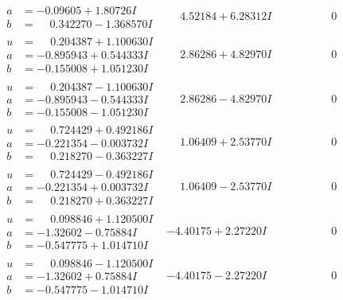 \documentclass[1p]{elsarticle_modified}
\theoremstyle{definition}
\begin{document}
$$\begin{array}{c|c|c}
\begin{aligned}
a &= -0.09605 + 1.80726 I \\
b &= \phantom{-}0.342270 - 1.368570 I\end{aligned}
 & \phantom{-}4.52184 + 6.28312 I & \phantom{-0.000000 } 0 \\ \hline\begin{aligned}
u &= \phantom{-}0.204387 + 1.100630 I \\
a &= -0.895943 + 0.544333 I \\
b &= -0.155008 + 1.051230 I\end{aligned}
 & \phantom{-}2.86286 + 4.82970 I & \phantom{-0.000000 } 0 \\ \hline\begin{aligned}
u &= \phantom{-}0.204387 - 1.100630 I \\
a &= -0.895943 - 0.544333 I \\
b &= -0.155008 - 1.051230 I\end{aligned}
 & \phantom{-}2.86286 - 4.82970 I & \phantom{-0.000000 } 0 \\ \hline\begin{aligned}
u &= \phantom{-}0.724429 + 0.492186 I \\
a &= -0.221354 - 0.003732 I \\
b &= \phantom{-}0.218270 - 0.363227 I\end{aligned}
 & \phantom{-}1.06409 + 2.53770 I & \phantom{-0.000000 } 0 \\ \hline\begin{aligned}
u &= \phantom{-}0.724429 - 0.492186 I \\
a &= -0.221354 + 0.003732 I \\
b &= \phantom{-}0.218270 + 0.363227 I\end{aligned}
 & \phantom{-}1.06409 - 2.53770 I & \phantom{-0.000000 } 0 \\ \hline\begin{aligned}
u &= \phantom{-}0.098846 + 1.120500 I \\
a &= -1.32602 - 0.75884 I \\
b &= -0.547775 + 1.014710 I\end{aligned}
 & -4.40175 + 2.27220 I & \phantom{-0.000000 } 0 \\ \hline\begin{aligned}
u &= \phantom{-}0.098846 - 1.120500 I \\
a &= -1.32602 + 0.75884 I \\
b &= -0.547775 - 1.014710 I\end{aligned}
 & -4.40175 - 2.27220 I & \phantom{-0.000000 } 0\\

\end{array}$$
\end{document}
